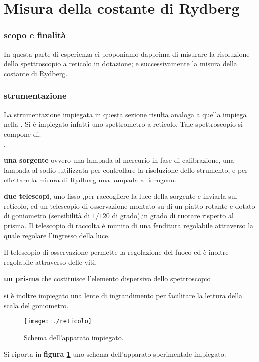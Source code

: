 \part{Misura della costante di Rydberg}
\section{scopo e finalità}
	In questa parte di esperienza ci proponiamo dapprima di misurare la 
	risoluzione dello spettroscopio a reticolo in dotazione;
	e successivamente la misura della costante di Rydberg.
\section{strumentazione}
	La strumentazione impiegata 
	in questa sezione risulta analoga a quella impiega
	nella .
	Si è impiegato infatti uno spettrometro a reticolo.
	Tale spettroscopio si compone di:
	\begin{list}{$\cdot$}{}
		\item \textbf{una sorgente } ovvero una lampada al mercurio in fase di
		calibrazione, una lampada al sodio ,utilizzata per controllare la risoluzione dello strumento, e per effettare la misura di Rydberg
		una lampada al idrogeno.
		\item \textbf{due telescopi}, uno fisso	,per raccogliere la luce della 
		sorgente e inviarla sul reticolo, ed un telescopio di osservazione
		montato su di un piatto rotante e dotato di goniometro 
		(sensibilità di $1/120$ di grado),in grado di ruotare 
		rispetto al prisma.
		Il telescopio di raccolta  è munito di una fenditura regolabile
		attraverso la quale regolare l'ingresso della luce.
	
		Il telescopio di osservazione permette la regolazione del fuoco ed è 
		inoltre regolabile attraverso delle viti.
		\item \textbf{un prisma} che costituisce l'elemento dispersivo dello
		spettroscopio 
	\end{list}
	\bigskip
	si è inoltre impiegato una lente di ingrandimento per facilitare la lettura della scala del goniometro.

\bigskip


\begin{figure} [!h]
	\centering
	\texttt{[image: ./reticolo]}
	\caption{Schema dell'apparato impiegato.}
	\label{fig:reticolo}
\end{figure}
Si riporta in \textbf{figura \ref{fig:reticolo} }uno schema dell'apparato
sperimentale impiegato. 